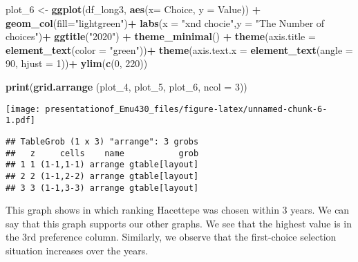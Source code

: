 \documentclass[
]{article}
\newenvironment{Shaded}{\begin{snugshade}}{\end{snugshade}}
\newcommand{\AttributeTok}[1]{\textcolor[rgb]{0.13,0.29,0.53}{#1}}
\newcommand{\DecValTok}[1]{\textcolor[rgb]{0.00,0.00,0.81}{#1}}
\newcommand{\FunctionTok}[1]{\textcolor[rgb]{0.13,0.29,0.53}{\textbf{#1}}}
\newcommand{\NormalTok}[1]{#1}
\newcommand{\OtherTok}[1]{\textcolor[rgb]{0.56,0.35,0.01}{#1}}
\newcommand{\SpecialCharTok}[1]{\textcolor[rgb]{0.81,0.36,0.00}{\textbf{#1}}}
\newcommand{\StringTok}[1]{\textcolor[rgb]{0.31,0.60,0.02}{#1}}
\begin{document}
\begin{Shaded}
\begin{Highlighting}[]
\NormalTok{plot\_6 }\OtherTok{\textless{}{-}} \FunctionTok{ggplot}\NormalTok{(df\_long3, }\FunctionTok{aes}\NormalTok{(}\AttributeTok{x=}\NormalTok{ Choice, }\AttributeTok{y =}\NormalTok{ Value)) }\SpecialCharTok{+} 
  \FunctionTok{geom\_col}\NormalTok{(}\AttributeTok{fill=}\StringTok{"lightgreen"}\NormalTok{)}\SpecialCharTok{+}
  \FunctionTok{labs}\NormalTok{(}\AttributeTok{x =} \StringTok{"xnd chocie"}\NormalTok{,}\AttributeTok{y =} \StringTok{"The Number of choices"}\NormalTok{)}\SpecialCharTok{+}
  \FunctionTok{ggtitle}\NormalTok{(}\StringTok{"2020"}\NormalTok{) }\SpecialCharTok{+}
  \FunctionTok{theme\_minimal}\NormalTok{() }\SpecialCharTok{+}
  \FunctionTok{theme}\NormalTok{(}\AttributeTok{axis.title =} \FunctionTok{element\_text}\NormalTok{(}\AttributeTok{color =} \StringTok{"green"}\NormalTok{))}\SpecialCharTok{+}
  \FunctionTok{theme}\NormalTok{(}\AttributeTok{axis.text.x =} \FunctionTok{element\_text}\NormalTok{(}\AttributeTok{angle =} \DecValTok{90}\NormalTok{, }\AttributeTok{hjust =} \DecValTok{1}\NormalTok{))}\SpecialCharTok{+}
  \FunctionTok{ylim}\NormalTok{(}\FunctionTok{c}\NormalTok{(}\DecValTok{0}\NormalTok{, }\DecValTok{220}\NormalTok{))}


\FunctionTok{print}\NormalTok{(}\FunctionTok{grid.arrange}\NormalTok{ (plot\_4, plot\_5, plot\_6, }\AttributeTok{ncol =} \DecValTok{3}\NormalTok{))}
\end{Highlighting}
\end{Shaded}

\texttt{[image: presentationof\_Emu430\_files/figure-latex/unnamed-chunk-6-1.pdf]}

\begin{verbatim}
## TableGrob (1 x 3) "arrange": 3 grobs
##   z     cells    name           grob
## 1 1 (1-1,1-1) arrange gtable[layout]
## 2 2 (1-1,2-2) arrange gtable[layout]
## 3 3 (1-1,3-3) arrange gtable[layout]
\end{verbatim}

This graph shows in which ranking Hacettepe was chosen within 3 years.
We can say that this graph supports our other graphs. We see that the
highest value is in the 3rd preference column. Similarly, we observe
that the first-choice selection situation increases over the years.
\end{document}

